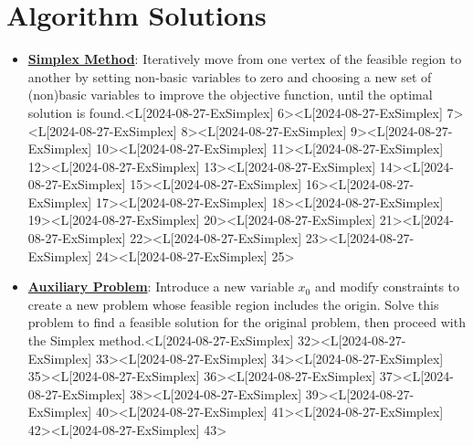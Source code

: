 \documentclass{article}%
\begin{document}
\newpage

%
\section{Algorithm Solutions}%
\label{sec:AlgorithmSolutions}%
\begin{itemize}[[leftmargin=*]]%
\item \href{https://www.math.purdue.edu/~yipn/421/2024-08-27-ExSimplex.pdf#page=6}{\textbf{Simplex Method}}: Iteratively move from one vertex of the feasible region to another by setting non-basic variables to zero and choosing a new set of (non)basic variables to improve the objective function, until the optimal solution is found.<L[2024-08-27-ExSimplex] 6><L[2024-08-27-ExSimplex] 7><L[2024-08-27-ExSimplex] 8><L[2024-08-27-ExSimplex] 9><L[2024-08-27-ExSimplex] 10><L[2024-08-27-ExSimplex] 11><L[2024-08-27-ExSimplex] 12><L[2024-08-27-ExSimplex] 13><L[2024-08-27-ExSimplex] 14><L[2024-08-27-ExSimplex] 15><L[2024-08-27-ExSimplex] 16><L[2024-08-27-ExSimplex] 17><L[2024-08-27-ExSimplex] 18><L[2024-08-27-ExSimplex] 19><L[2024-08-27-ExSimplex] 20><L[2024-08-27-ExSimplex] 21><L[2024-08-27-ExSimplex] 22><L[2024-08-27-ExSimplex] 23><L[2024-08-27-ExSimplex] 24><L[2024-08-27-ExSimplex] 25>%
\item \href{https://www.math.purdue.edu/~yipn/421/2024-08-27-ExSimplex.pdf#page=32}{\textbf{Auxiliary Problem}}: Introduce a new variable  $x_0$ and modify constraints to create a new problem whose feasible region includes the origin. Solve this problem to find a feasible solution for the original problem, then proceed with the Simplex method.<L[2024-08-27-ExSimplex] 32><L[2024-08-27-ExSimplex] 33><L[2024-08-27-ExSimplex] 34><L[2024-08-27-ExSimplex] 35><L[2024-08-27-ExSimplex] 36><L[2024-08-27-ExSimplex] 37><L[2024-08-27-ExSimplex] 38><L[2024-08-27-ExSimplex] 39><L[2024-08-27-ExSimplex] 40><L[2024-08-27-ExSimplex] 41><L[2024-08-27-ExSimplex] 42><L[2024-08-27-ExSimplex] 43>%
\end{itemize}%
\newpage

%
\end{document}
